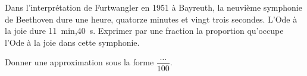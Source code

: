 
\begin{exercice}\label{exosmath-0819}

    Dans l'interprétation de Furtwangler en 1951 à Bayreuth, la neuvième symphonie de Beethoven dure une heure, quatorze minutes et vingt trois secondes. L'Ode à la joie dure \SI{11}{\minute},\SI{40}{\second}. Exprimer par une fraction la proportion qu'occupe l'Ode à la joie dans cette symphonie. 

    Donner une approximation sous la forme \( \dfrac{ \ldots }{ 100 }\).

\end{exercice}
